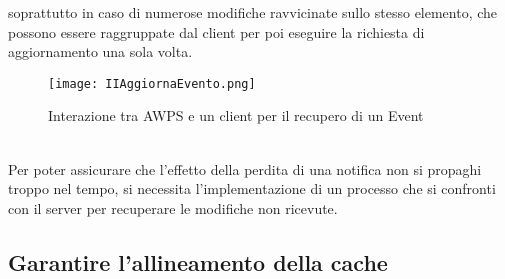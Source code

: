 soprattutto in caso di numerose modifiche ravvicinate sullo stesso elemento, 
che possono essere raggruppate dal client
per poi eseguire la richiesta di aggiornamento una sola volta.\\
\begin{figure}[htpb]
    \centering
    \texttt{[image: IIAggiornaEvento.png]}
    \caption{Interazione tra AWPS e un client per il recupero di un Event}
\end{figure}	
\\
Per poter assicurare che l'effetto della perdita di una notifica
non si propaghi troppo nel tempo,
si necessita l'implementazione di un processo che
si confronti con il server per recuperare le modifiche non ricevute.
\clearpage

\subsection{Garantire l'allineamento della cache}

